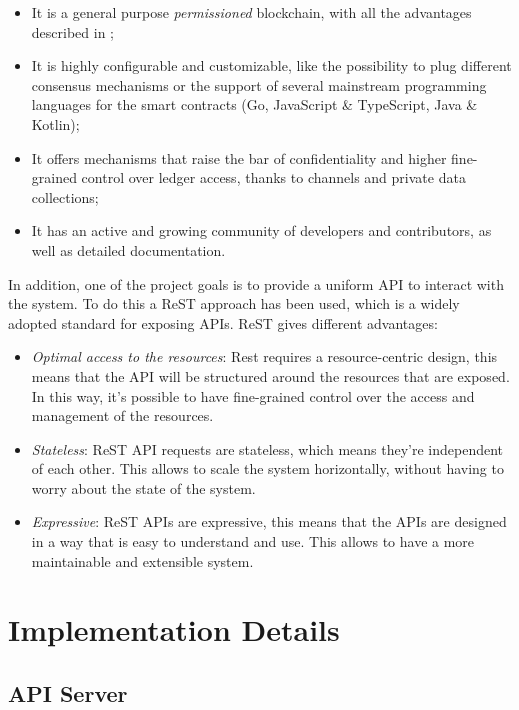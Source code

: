 \documentclass{scrartcl}
\begin{document}
\begin{itemize}
    \item It is a general purpose \textit{permissioned} blockchain, with all the advantages described in ;
    \item It is highly configurable and customizable, like the possibility to plug different consensus mechanisms or the support of several mainstream programming languages for the smart contracts (Go, JavaScript \& TypeScript, Java \& Kotlin);
    \item It offers mechanisms that raise the bar of confidentiality and higher fine-grained control over ledger access, thanks to channels and private data collections;
    \item It has an active and growing community of developers and contributors, as well as detailed documentation.
\end{itemize}

In addition, one of the project goals is to provide a uniform API to interact with the system. 
%
To do this a ReST approach has been used, which is a widely adopted standard for exposing APIs. 
%
ReST gives different advantages:

\begin{itemize}
    \item \emph{Optimal access to the resources}: Rest requires a resource-centric design, this means that the API will be structured around the resources that are exposed. In this way, it's possible to have fine-grained control over the access and management of the resources.
    \item \emph{Stateless}: ReST API requests are stateless, which means they're independent of each other. This allows to scale the system horizontally, without having to worry about the state of the system.
    \item \emph{Expressive}: ReST APIs are expressive, this means that the APIs are designed in a way that is easy to understand and use. This allows to have a more maintainable and extensible system.
\end{itemize}

\fi

\section{Implementation Details}

\subsection{API Server}
\end{document}
